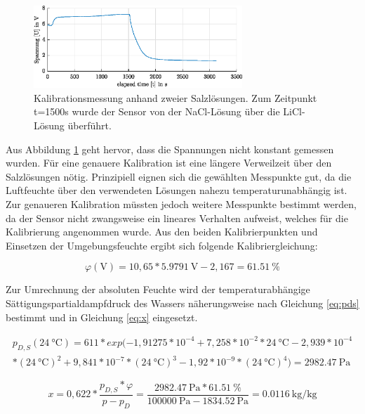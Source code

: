 \begin{figure}[H]
	\centering
	\includegraphics[width=0.7\textwidth]{../DATA/Messreihe_Feuchtekalibration.eps}
	\caption[Kalibrationsmessung]{Kalibrationsmessung anhand zweier Salzlösungen. Zum Zeitpunkt t=1500s wurde der Sensor von der NaCl-Lösung über die LiCl-Lösung überführt.}
	\label{fig:cal}
\end{figure}

Aus Abbildung \ref{fig:cal} geht hervor, dass die Spannungen nicht konstant gemessen wurden. Für eine genauere Kalibration ist eine längere Verweilzeit über den Salzlösungen nötig. Prinzipiell eignen sich die gewählten Messpunkte gut, da die Luftfeuchte über den verwendeten Lösungen nahezu temperaturunabhängig ist. Zur genaueren Kalibration müssten jedoch weitere Messpunkte bestimmt werden, da der Sensor nicht zwangsweise ein lineares Verhalten aufweist, welches für die Kalibrierung angenommen wurde. Aus den beiden Kalibrierpunkten und Einsetzen der Umgebungsfeuchte ergibt sich folgende Kalibriergleichung:



\begin{equation}
	\label{eq:cal}
	\varphi(\text{V})=10,65*\SI{5,9791}{\volt}-2,167=\SI{61,51}{\percent}
\end{equation}

Zur Umrechnung der absoluten Feuchte wird der temperaturabhängige Sättigungspartialdampfdruck des Wassers näherungsweise nach Gleichung \ref{eq:pds} bestimmt und in Gleichung \ref{eq:x} eingesetzt. 

\begin{multline}
	\label{eq:pds}
	p_{D,S}(\SI{24}{\celsius}) = 611*exp(-1,91275*10^{-4}+7,258*10^{-2}*\SI{24}{\celsius}-2,939*10^{-4}\\*(\SI{24}{\celsius})^2 +9,841*10^{-7}*(\SI{24}{\celsius})^3-1,92*10^{-9}*(\SI{24}{\celsius})^4)=\SI{2982,47}{\pascal}
\end{multline}

\begin{equation}
	\label{eq:x}
	x=0,622*\frac{p_{D,S}*\varphi}{p-p_D}=\frac{\SI{2982,47}{\pascal}*\SI{61,51}{\percent}}{\SI{100000}{\pascal}-\SI{1834,52}{\pascal}}=\SI{0,0116}{\kilogram\per\kilogram}
\end{equation}

